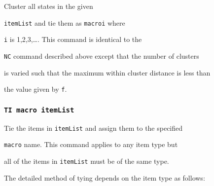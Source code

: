 Cluster all states in the given 


\texttt{itemList} and tie them as \texttt{macroi} where 


\texttt{i} is 1,2,3,\ldots. This command is identical to the


\texttt{NC} command described above except that the number of clusters


is varied such that the maximum within cluster distance is less than


the value given by \texttt{f}.





\subsubsection*{\tt TI macro itemList}





Tie the items in \texttt{itemList} and assign them to the specified 


\texttt{macro} name.  This command applies to any item type but 


all of the items in \texttt{itemList} must be of the same type.


The detailed method of tying depends on the item type as follows:


